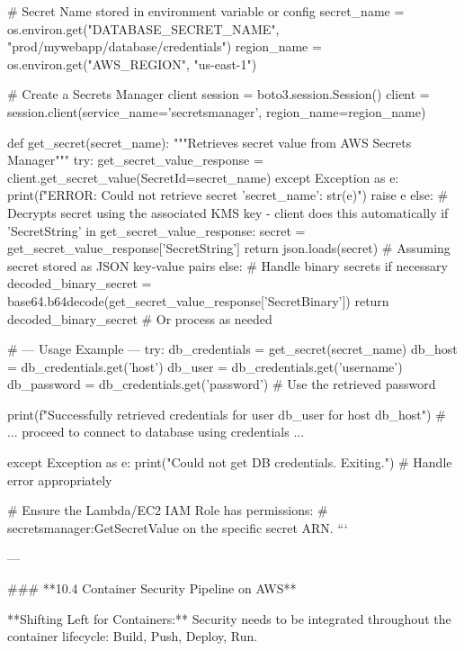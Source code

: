 \documentclass{article}
\begin{document}
# Secret Name stored in environment variable or config
secret_name = os.environ.get("DATABASE_SECRET_NAME", "prod/mywebapp/database/credentials")
region_name = os.environ.get("AWS_REGION", "us-east-1")

# Create a Secrets Manager client
session = boto3.session.Session()
client = session.client(service_name='secretsmanager', region_name=region_name)

def get_secret(secret_name):
    """Retrieves secret value from AWS Secrets Manager"""
    try:
        get_secret_value_response = client.get_secret_value(SecretId=secret_name)
    except Exception as e:
        print(f"ERROR: Could not retrieve secret '{secret_name}': {str(e)}")
        raise e
    else:
        # Decrypts secret using the associated KMS key - client does this automatically
        if 'SecretString' in get_secret_value_response:
            secret = get_secret_value_response['SecretString']
            return json.loads(secret) # Assuming secret stored as JSON key-value pairs
        else:
            # Handle binary secrets if necessary
            decoded_binary_secret = base64.b64decode(get_secret_value_response['SecretBinary'])
            return decoded_binary_secret # Or process as needed

# --- Usage Example ---
try:
    db_credentials = get_secret(secret_name)
    db_host = db_credentials.get('host')
    db_user = db_credentials.get('username')
    db_password = db_credentials.get('password') # Use the retrieved password

    print(f"Successfully retrieved credentials for user {db_user} for host {db_host}")
    # ... proceed to connect to database using credentials ...

except Exception as e:
    print("Could not get DB credentials. Exiting.")
    # Handle error appropriately

# Ensure the Lambda/EC2 IAM Role has permissions:
# secretsmanager:GetSecretValue on the specific secret ARN.
```

---

### **10.4 Container Security Pipeline on AWS**

**Shifting Left for Containers:** Security needs to be integrated throughout the container lifecycle: Build, Push, Deploy, Run.
\end{document}
